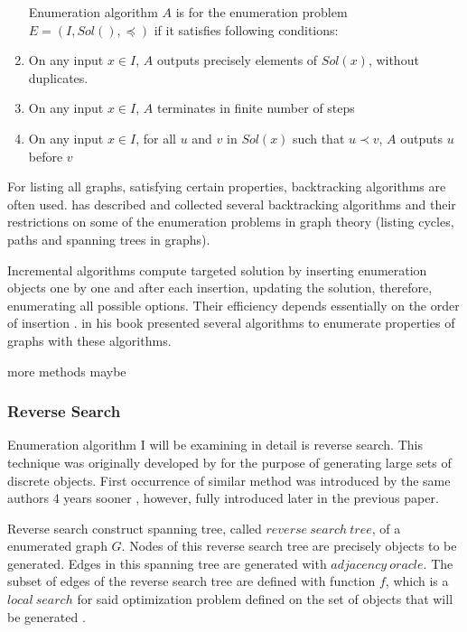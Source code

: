 \begin{definition}
  \begin{enumerate}
  Enumeration algorithm $A$ is for the enumeration problem $E = (I,Sol(),\preceq)$ if it satisfies following conditions:
  \item On any input $x \in I$, $A$ outputs precisely elements of $Sol(x)$, without duplicates.
  \item On any input $x \in I$, $A$ terminates in finite number of steps
  \item On any input $x \in I$, for all $u$ and $v$ in $Sol(x)$ such that $u \prec v$, $A$ outputs $u$ before $v$
  \end{enumerate}
\end{definition}

For listing all graphs, satisfying certain properties, backtracking algorithms are often used. \textcite{read1975bounds} has described and collected several backtracking algorithms and their restrictions on some of the enumeration problems in graph theory (listing cycles, paths and spanning trees in graphs).

Incremental algorithms compute targeted solution by inserting enumeration objects one by one and after each insertion, updating the solution, therefore, enumerating all possible options. Their efficiency depends essentially on the order of insertion \parencite{matousek-2001}. \textcite{edelsbrunner1987algorithms} in his book presented several algorithms to enumerate properties of graphs with these algorithms.

\textcite{fisikopoulos2009triangulations} more methods maybe 

\subsubsection{Reverse Search}

Enumeration algorithm I will be examining in detail is reverse search. This technique was originally developed by \textcite{avis1996reverse} for the purpose of generating large sets of discrete objects. First occurrence of similar method was introduced by the same authors 4 years sooner \textcite{avis1991pivoting}, however, fully introduced later in the previous paper.

Reverse search construct spanning tree, called $reverse\ search\ tree$, of a enumerated graph $G$. Nodes of this reverse search tree are precisely objects to be generated. Edges in this spanning tree are generated with $adjacency\ oracle$. The subset of edges of the reverse search tree are defined with function $f$, which is a $local\ search$ for said optimization problem defined on the set of objects that will be generated \parencite{david2000tutorial}.

